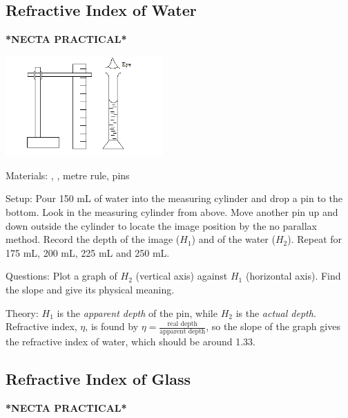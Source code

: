 \begin{multicols}{2}
\subsection{Refractive Index of Water}
\textbf{*NECTA PRACTICAL*}

\begin{center}
\includegraphics[width=0.45\textwidth]{./img/refractive-index-water.png}
\end{center}

\begin{description*}
\item[Materials:]{, , metre rule, pins}
\item[Setup:]{Pour 150 mL of water into the measuring cylinder and drop a pin to the bottom. Look in the measuring cylinder from above. Move another pin up and down outside the cylinder to locate the image position by the no parallax method. Record the depth of the image ($H_1$) and of the water ($H_2$). Repeat for 175 mL, 200 mL, 225 mL and 250 mL.}
\item[Questions:]{Plot a graph of $H_2$ (vertical axis) against $H_1$ (horizontal axis). Find the slope and give its physical meaning.}
\item[Theory:]{$H_1$ is the \emph{apparent depth} of the pin, while $H_2$ is the \emph{actual depth}. Refractive index, $\eta$, is found by $\eta = \frac{\text{real depth}}{\text{apparent depth}}$, so the slope of the graph gives the refractive index of water, which should be around 1.33.}
\end{description*}

\subsection{Refractive Index of Glass} \label{sub:refr-index-glass}
\textbf{*NECTA PRACTICAL*}


\end{multicols}

